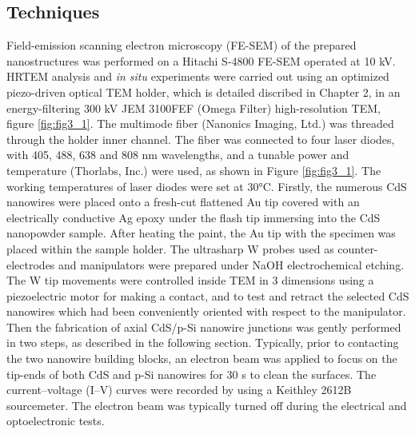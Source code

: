 \subsection{Techniques}
Field-emission scanning electron microscopy (FE-SEM) of the prepared nanostructures was performed on a Hitachi S-4800 FE-SEM operated at 10 kV. HRTEM analysis and {\em in situ} experiments were carried out using an optimized piezo-driven optical TEM holder, which is detailed discribed in Chapter 2, in an energy-filtering 300 kV JEM 3100FEF (Omega Filter) high-resolution TEM, figure \ref{fig:fig3_1}. The multimode fiber (Nanonics Imaging, Ltd.) was threaded through the holder inner channel. The fiber was connected to four laser diodes, with 405, 488, 638 and 808 nm wavelengths, and a tunable power and temperature (Thorlabs, Inc.) were used, as shown in Figure \ref{fig:fig3_1}. The working temperatures of laser diodes were set at 30°C. Firstly, the numerous CdS nanowires were placed onto a fresh-cut flattened Au tip covered with an electrically conductive Ag epoxy under the flash tip immersing into the CdS nanopowder sample. After heating the paint, the Au tip with the specimen was placed within the sample holder. The ultrasharp W probes used as counter-electrodes and manipulators were prepared under NaOH electrochemical etching. The W tip movements were controlled inside TEM in 3 dimensions using a piezoelectric motor for making a contact, and to test and retract the selected CdS nanowires which had been conveniently oriented with respect to the manipulator. Then the fabrication of axial CdS/p-Si nanowire junctions was gently performed in two steps, as described in the following section. Typically, prior to contacting the two nanowire building blocks, an electron beam was applied to focus on the tip-ends of both CdS and p-Si nanowires for 30 s to clean the surfaces. The current–voltage (I–V) curves were recorded by using a Keithley 2612B sourcemeter. The electron beam was typically turned off during the electrical and optoelectronic tests. 

